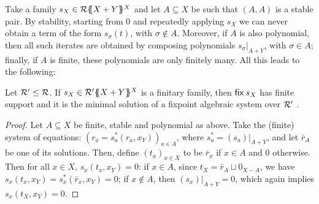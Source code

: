 Take a family $s_X\in {\mathcal{R}}\{\!\!\{X+Y\}\!\!\}^X$ and let $A\subseteq X$ be such that $(A,A)$ is a stable pair. 
By stability, starting from $0$ and repeatedly applying $s_X$ we can never obtain a term of the form $s_\sigma(t)$, with $\sigma\notin A$. Moreover, if $A$ is also polynomial, then all such iterates are obtained by composing polynomials $s_\sigma\vert_{A+Y}$, with $\sigma\in A$; finally, if $A$ is finite, these polynomials are only finitely many. All this leads to the following:
%
%	
%
	\begin{proposition}\label{prop:fintoalg}
		 Let $\mathcal{R}'\leq\mathcal{R}$.  
		 If $s_X\in {\mathcal{R}'}\{\!\!\{X+Y\}\!\!\}^X$ is a finitary family, then $\mathsf{fix}\: s_X$ has finite support and it is the minimal solution of a fixpoint algebraic system over $\mathcal{R}'$ .  
   \end{proposition}
   \begin{proof}
   Let $A\subseteq X$ be finite, stable and polynomial as above.
 Take the (finite) system of equations: $(r_a = s^*_a(r_a, x_Y))_{a \in A}$, where $s^*_a=(s_a)\vert_{A+Y}$, and let $\bar r_A$ be one of its solutions. Then, define $(t_x)_{x \in X}$ to be $\bar r_x$ if $x \in A$ and $0$ otherwise. 
Then for all $x\in X$, $s_x(t_x,x_Y)=0$: if $x\in A$, since $t_X=\bar r_{A} \sqcup 0_{X-A}$, we have
$s_x(t_x,x_Y)=s^*_x(\bar r_x,x_Y)=0$; if $x \not \in A$, then $(s_x)\vert_{A+Y}=0$, which again implies
%		
		$s_x(t_X, x_Y)=0$.
   \end{proof}
%


